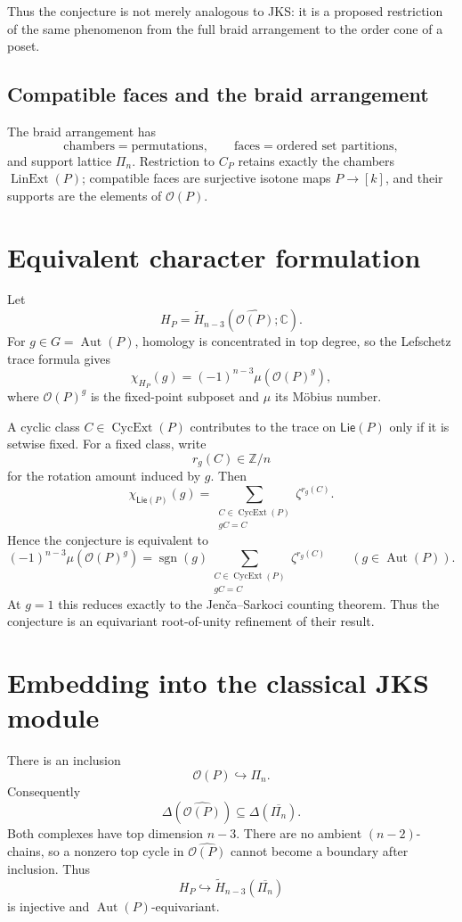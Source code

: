 \documentclass[11pt]{article}
\newcommand{\OP}{\mathcal O}
\newcommand{\Lin}{\operatorname{LinExt}}
\newcommand{\Aut}{\operatorname{Aut}}
\newcommand{\Cyc}{\operatorname{CycExt}}
\newcommand{\sgn}{\operatorname{sgn}}
\begin{document}
Thus the conjecture is not merely analogous to JKS: it is a proposed
restriction of the same phenomenon from the full braid arrangement to the
order cone of a poset.

\subsection{Compatible faces and the braid arrangement}
The braid arrangement has
\[
\text{chambers}=\text{permutations},\qquad
\text{faces}=\text{ordered set partitions},
\]
and support lattice $\Pi_n$. Restriction to $C_P$ retains exactly the
chambers $\Lin(P)$; compatible faces are surjective isotone maps $P\to[k]$,
and their supports are the elements of $\OP(P)$.

\section{Equivalent character formulation}
Let
\[
H_P=\widetilde H_{n-3}(\widehat{\OP(P)};\mathbb C).
\]
For $g\in G=\Aut(P)$, homology is concentrated in top degree, so the
Lefschetz trace formula gives
\begin{equation}
\chi_{H_P}(g)=(-1)^{n-3}\mu(\OP(P)^g),
\label{eq:homchar}
\end{equation}
where $\OP(P)^g$ is the fixed-point subposet and $\mu$ its M\"obius number.

A cyclic class $C\in\Cyc(P)$ contributes to the trace on $\mathsf{Lie}(P)$
only if it is setwise fixed. For a fixed class, write
\[
r_g(C)\in\mathbb Z/n
\]
for the rotation amount induced by $g$. Then
\begin{equation}
\chi_{\mathsf{Lie}(P)}(g)=
\sum_{\substack{C\in\Cyc(P)\\gC=C}}\zeta^{r_g(C)}.
\label{eq:liechar}
\end{equation}
Hence the conjecture is equivalent to
\begin{equation}
\boxed{
(-1)^{n-3}\mu(\OP(P)^g)
=\sgn(g)\sum_{\substack{C\in\Cyc(P)\\gC=C}}\zeta^{r_g(C)}}
\qquad(g\in\Aut(P)).
\label{eq:characterconj}
\end{equation}
At $g=1$ this reduces exactly to the Jen\v{c}a--Sarkoci counting theorem.
Thus the conjecture is an equivariant root-of-unity refinement of their
result.

\section{Embedding into the classical JKS module}
There is an inclusion
\[
\OP(P)\hookrightarrow\Pi_n.
\]
Consequently
\[
\Delta(\widehat{\OP(P)})\subseteq\Delta(\overline{\Pi_n}).
\]
Both complexes have top dimension $n-3$. There are no ambient
$(n-2)$-chains, so a nonzero top cycle in $\widehat{\OP(P)}$ cannot become a
boundary after inclusion. Thus
\begin{equation}
H_P\hookrightarrow\widetilde H_{n-3}(\overline{\Pi_n})
\label{eq:homembed}
\end{equation}
is injective and $\Aut(P)$-equivariant.
\end{document}
